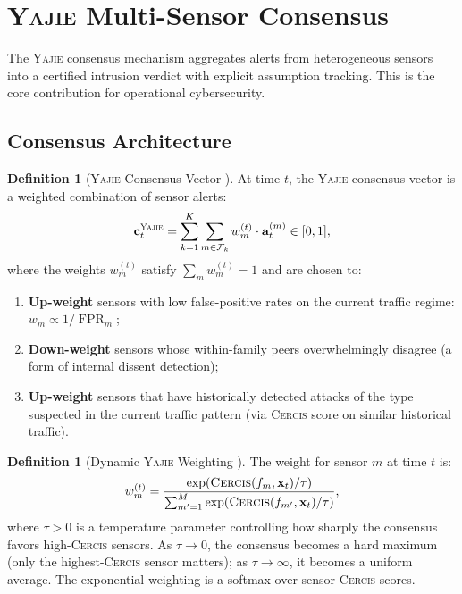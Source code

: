 \documentclass[11pt,a4paper]{article}
\theoremstyle{definition}
\newtheorem{definition}[theorem]{Definition}
\theoremstyle{remark}
\newcommand{\Yajie}{\textsc{Yajie}}
\newcommand{\Cercis}{\textsc{Cercis}}
\DeclareMathOperator{\FPR}{FPR}
\newcommand{\cF}{\mathcal{F}}
\newcommand{\sensorstate}{\mathbf{x}}
\newcommand{\alertvec}{\mathbf{a}}
\begin{document}
\section{\Yajie{} Multi-Sensor Consensus }
\label{sec:yajie}

The \Yajie{} consensus mechanism aggregates alerts from heterogeneous sensors into a certified intrusion verdict with explicit assumption tracking. This is the core contribution for operational cybersecurity.

\subsection{Consensus Architecture}

\begin{definition}[\Yajie{} Consensus Vector ]
\label{def:yajie_vector}
At time $t$, the \Yajie{} consensus vector is a weighted combination of sensor alerts:
\begin{equation}
\mathbf{c}_t^{\Yajie} = \sum_{k=1}^{K} \sum_{m \in \cF_k} w_m^{(t)} \cdot \alertvec_t^{(m)} \in [0, 1],
\label{eq:yajie_vector}
\end{equation}
where the weights $w_m^{(t)}$ satisfy $\sum_{m} w_m^{(t)} = 1$ and are chosen to:
\begin{enumerate}[label=(\roman*)]
    \item \textbf{Up-weight} sensors with low false-positive rates on the current traffic regime: $w_m \propto 1 / \FPR_m$;
    \item \textbf{Down-weight} sensors whose within-family peers overwhelmingly disagree (a form of internal dissent detection);
    \item \textbf{Up-weight} sensors that have historically detected attacks of the type suspected in the current traffic pattern (via \Cercis{} score on similar historical traffic).
\end{enumerate}
\end{definition}

\begin{definition}[Dynamic \Yajie{} Weighting ]
\label{def:dynamic_yajie}
The weight for sensor $m$ at time $t$ is:
\begin{equation}
w_m^{(t)} = \frac{\exp(\Cercis(f_m, \sensorstate_t) / \tau)}{\sum_{m'=1}^{M} \exp(\Cercis(f_{m'}, \sensorstate_t) / \tau)},
\label{eq:dynamic_weight}
\end{equation}
where $\tau > 0$ is a temperature parameter controlling how sharply the consensus favors high-\Cercis{} sensors. As $\tau \to 0$, the consensus becomes a hard maximum (only the highest-\Cercis{} sensor matters); as $\tau \to \infty$, it becomes a uniform average. The exponential weighting is a softmax over sensor \Cercis{} scores.
\end{definition}
\end{document}
